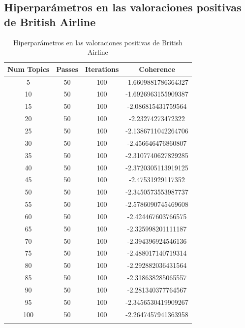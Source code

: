 \documentclass{report}
\begin{document}
{            \subsection{Hiperparámetros en las valoraciones positivas de British Airline}
                \label{tab:hiperparametros_british_airline_positivas}
                \begin{longtable}{|c|c|c|c|}
                    \hline
                    \textbf{Num Topics} & \textbf{Passes} & \textbf{Iterations} & \textbf{Coherence} \\
                    \hline
                    5 & 50 & 100 & -1.6609881786364327 \\
                    \hline
                    10 & 50 & 100 & -1.6926963155909387 \\
                    \hline
                    15 & 50 & 100 & -2.086815431759564 \\
                    \hline
                    20 & 50 & 100 & -2.23274273472322 \\
                    \hline
                    25 & 50 & 100 & -2.1386711042264706 \\
                    \hline
                    30 & 50 & 100 & -2.456646476860807 \\
                    \hline
                    35 & 50 & 100 & -2.3107740627829285 \\
                    \hline
                    40 & 50 & 100 & -2.3720305113919125 \\
                    \hline
                    45 & 50 & 100 & -2.47531929117352 \\
                    \hline
                    50 & 50 & 100 & -2.3450573553987737 \\
                    \hline
                    55 & 50 & 100 & -2.5786090745469608 \\
                    \hline
                    60 & 50 & 100 & -2.424467603766575 \\
                    \hline
                    65 & 50 & 100 & -2.325998201111187 \\
                    \hline
                    70 & 50 & 100 & -2.394396924546136 \\
                    \hline
                    75 & 50 & 100 & -2.488017140719314 \\
                    \hline
                    80 & 50 & 100 & -2.292882036431564 \\
                    \hline
                    85 & 50 & 100 & -2.318638285065557 \\
                    \hline
                    90 & 50 & 100 & -2.281340377764567 \\
                    \hline
                    95 & 50 & 100 & -2.3456530419909267 \\
                    \hline
                    100 & 50 & 100 & -2.2647457941363958 \\
                    \hline
                    \caption{Hiperparámetros en las valoraciones positivas de British Airline}
                \end{longtable}

}
\end{document}
